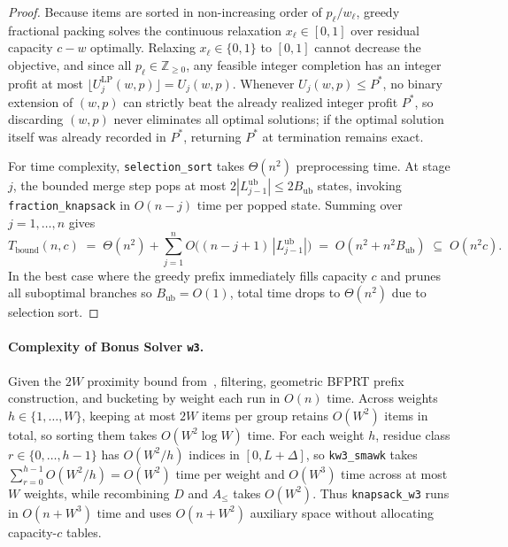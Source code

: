 \documentclass[10pt, a4paper]{article}
\newcommand{\code}[1]{\texttt{\color{primary!90!black}#1}}
\begin{document}
\begin{proof}
Because items are sorted in non-increasing order of $p_\ell / w_\ell$, greedy fractional packing solves the continuous relaxation $x_\ell \in [0,1]$ over residual capacity $c - w$ optimally. Relaxing $x_\ell \in \{0,1\}$ to $[0,1]$ cannot decrease the objective, and since all $p_\ell \in \mathbb{Z}_{\ge 0}$, any feasible integer completion has an integer profit at most $\lfloor U_j^{\text{LP}}(w, p) \rfloor = U_j(w, p)$. Whenever $U_j(w, p) \le P^*$, no binary extension of $(w, p)$ can strictly beat the already realized integer profit $P^*$, so discarding $(w, p)$ never eliminates all optimal solutions; if the optimal solution itself was already recorded in $P^*$, returning $P^*$ at termination remains exact.

For time complexity, \code{selection\_sort} takes $\Theta(n^2)$ preprocessing time. At stage $j$, the bounded merge step pops at most $2|L_{j-1}^{\text{ub}}| \le 2B_{\text{ub}}$ states, invoking \code{fraction\_knapsack} in $O(n - j)$ time per popped state. Summing over $j = 1, \ldots, n$ gives
\[
  T_{\text{bound}}(n, c) \;=\; \Theta(n^2) + \sum_{j=1}^{n} O\bigl((n - j + 1)\,|L_{j-1}^{\text{ub}}|\bigr) \;=\; O(n^2 + n^2 B_{\text{ub}}) \;\subseteq\; O(n^2 c).
\]
In the best case where the greedy prefix immediately fills capacity $c$ and prunes all suboptimal branches so $B_{\text{ub}} = O(1)$, total time drops to $\Theta(n^2)$ due to selection sort.
\end{proof}

\paragraph{Complexity of Bonus Solver \code{w3}.}
Given the $2W$ proximity bound from~\cite{polak2021knapsack}, filtering, geometric BFPRT prefix construction, and bucketing by weight each run in $O(n)$ time. Across weights $h \in \{1, \ldots, W\}$, keeping at most $2W$ items per group retains $O(W^2)$ items in total, so sorting them takes $O(W^2 \log W)$ time. For each weight $h$, residue class $r \in \{0, \ldots, h - 1\}$ has $O(W^2 / h)$ indices in $[0, L + \Delta]$, so \code{kw3\_smawk} takes $\sum_{r=0}^{h-1} O(W^2 / h) = O(W^2)$ time per weight and $O(W^3)$ time across at most $W$ weights, while recombining $D$ and $A_{\le}$ takes $O(W^2)$. Thus \code{knapsack\_w3} runs in $O(n + W^3)$ time and uses $O(n + W^2)$ auxiliary space without allocating capacity-$c$ tables.
\end{document}
